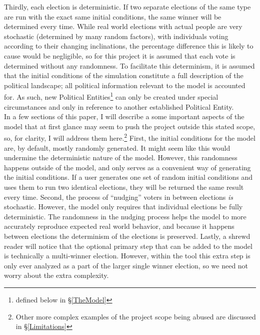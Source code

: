 \documentclass[12pt]{article}
\newcounter{step}
\begin{document}
\qquad Thirdly, each election is deterministic. If two separate elections of the same type are run with the exact same initial conditions, the same winner will be determined every time. While real world elections with actual people are very stochastic (determined by many random factors), with individuals voting according to their changing inclinations, the percentage difference this is likely to cause would be negligible, so for this project it is assumed that each vote is determined without any randomness. To facilitate this determinism, it is assumed that the initial conditions of the simulation constitute a full description of the political landscape; all political information relevant to the model is accounted for. As such, new Political Entities\footnote{defined below in \S \ref{TheModel}} can only be created under special circumstances and only in reference to another established Political Entity. \\

\qquad In a few sections of this paper, I will describe a some important aspects of the model that at first glance may seem to push the project outside this stated scope, so, for clarity, I will address them here.\footnote{Other more complex examples of the project scope being abused are discussed in \S \ref{Limitations}} First, the initial conditions for the model are, by default, mostly randomly generated. It might seem like this would undermine the deterministic nature of the model. However, this randomness happens outside of the model, and only serves as a convenient way of generating the initial conditions. If a user generates one set of random initial conditions and uses them to run two identical elections, they will be returned the same result every time. Second, the process of ``nudging'' voters in between elections \textit{is} stochastic. However, the model only requires that individual elections be fully deterministic. The randomness in the nudging process helps the model to more accurately reproduce expected real world behavior, and because it happens between elections the determinism of the elections is preserved. Lastly, a shrewd reader will notice that the optional primary step that can be added to the model is technically a multi-winner election. However, within the tool this extra step is only ever analyzed as a part of the larger single winner election, so we need not worry about the extra complexity. \\

\end{document}
